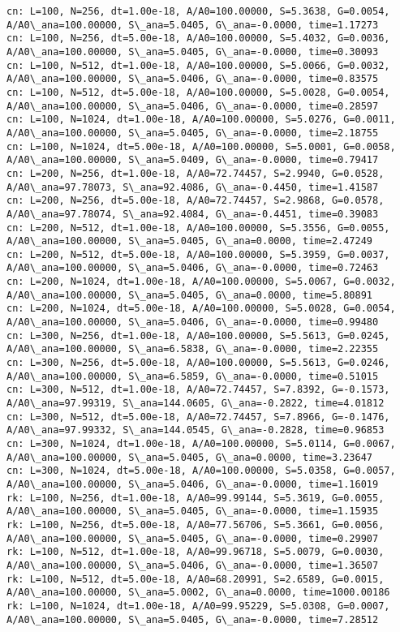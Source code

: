\documentclass[11pt]{article}
\begin{document}
    \begin{Verbatim}[commandchars=\\\{\}]
cn: L=100, N=256, dt=1.00e-18, A/A0=100.00000, S=5.3638, G=0.0054, A/A0\_ana=100.00000, S\_ana=5.0405, G\_ana=-0.0000, time=1.17273
cn: L=100, N=256, dt=5.00e-18, A/A0=100.00000, S=5.4032, G=0.0036, A/A0\_ana=100.00000, S\_ana=5.0405, G\_ana=-0.0000, time=0.30093
cn: L=100, N=512, dt=1.00e-18, A/A0=100.00000, S=5.0066, G=0.0032, A/A0\_ana=100.00000, S\_ana=5.0406, G\_ana=-0.0000, time=0.83575
cn: L=100, N=512, dt=5.00e-18, A/A0=100.00000, S=5.0028, G=0.0054, A/A0\_ana=100.00000, S\_ana=5.0406, G\_ana=-0.0000, time=0.28597
cn: L=100, N=1024, dt=1.00e-18, A/A0=100.00000, S=5.0276, G=0.0011, A/A0\_ana=100.00000, S\_ana=5.0405, G\_ana=-0.0000, time=2.18755
cn: L=100, N=1024, dt=5.00e-18, A/A0=100.00000, S=5.0001, G=0.0058, A/A0\_ana=100.00000, S\_ana=5.0409, G\_ana=-0.0000, time=0.79417
cn: L=200, N=256, dt=1.00e-18, A/A0=72.74457, S=2.9940, G=0.0528, A/A0\_ana=97.78073, S\_ana=92.4086, G\_ana=-0.4450, time=1.41587
cn: L=200, N=256, dt=5.00e-18, A/A0=72.74457, S=2.9868, G=0.0578, A/A0\_ana=97.78074, S\_ana=92.4084, G\_ana=-0.4451, time=0.39083
cn: L=200, N=512, dt=1.00e-18, A/A0=100.00000, S=5.3556, G=0.0055, A/A0\_ana=100.00000, S\_ana=5.0405, G\_ana=0.0000, time=2.47249
cn: L=200, N=512, dt=5.00e-18, A/A0=100.00000, S=5.3959, G=0.0037, A/A0\_ana=100.00000, S\_ana=5.0406, G\_ana=-0.0000, time=0.72463
cn: L=200, N=1024, dt=1.00e-18, A/A0=100.00000, S=5.0067, G=0.0032, A/A0\_ana=100.00000, S\_ana=5.0405, G\_ana=0.0000, time=5.80891
cn: L=200, N=1024, dt=5.00e-18, A/A0=100.00000, S=5.0028, G=0.0054, A/A0\_ana=100.00000, S\_ana=5.0406, G\_ana=-0.0000, time=0.99480
cn: L=300, N=256, dt=1.00e-18, A/A0=100.00000, S=5.5613, G=0.0245, A/A0\_ana=100.00000, S\_ana=6.5838, G\_ana=-0.0000, time=2.22355
cn: L=300, N=256, dt=5.00e-18, A/A0=100.00000, S=5.5613, G=0.0246, A/A0\_ana=100.00000, S\_ana=6.5859, G\_ana=-0.0000, time=0.51015
cn: L=300, N=512, dt=1.00e-18, A/A0=72.74457, S=7.8392, G=-0.1573, A/A0\_ana=97.99319, S\_ana=144.0605, G\_ana=-0.2822, time=4.01812
cn: L=300, N=512, dt=5.00e-18, A/A0=72.74457, S=7.8966, G=-0.1476, A/A0\_ana=97.99332, S\_ana=144.0545, G\_ana=-0.2828, time=0.96853
cn: L=300, N=1024, dt=1.00e-18, A/A0=100.00000, S=5.0114, G=0.0067, A/A0\_ana=100.00000, S\_ana=5.0405, G\_ana=0.0000, time=3.23647
cn: L=300, N=1024, dt=5.00e-18, A/A0=100.00000, S=5.0358, G=0.0057, A/A0\_ana=100.00000, S\_ana=5.0406, G\_ana=-0.0000, time=1.16019
rk: L=100, N=256, dt=1.00e-18, A/A0=99.99144, S=5.3619, G=0.0055, A/A0\_ana=100.00000, S\_ana=5.0405, G\_ana=-0.0000, time=1.15935
rk: L=100, N=256, dt=5.00e-18, A/A0=77.56706, S=5.3661, G=0.0056, A/A0\_ana=100.00000, S\_ana=5.0405, G\_ana=-0.0000, time=0.29907
rk: L=100, N=512, dt=1.00e-18, A/A0=99.96718, S=5.0079, G=0.0030, A/A0\_ana=100.00000, S\_ana=5.0406, G\_ana=-0.0000, time=1.36507
rk: L=100, N=512, dt=5.00e-18, A/A0=68.20991, S=2.6589, G=0.0015, A/A0\_ana=100.00000, S\_ana=5.0002, G\_ana=0.0000, time=1000.00186
rk: L=100, N=1024, dt=1.00e-18, A/A0=99.95229, S=5.0308, G=0.0007, A/A0\_ana=100.00000, S\_ana=5.0405, G\_ana=-0.0000, time=7.28512

    \end{Verbatim}
\end{document}
